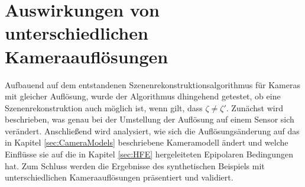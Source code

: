 \chapter{Auswirkungen von unterschiedlichen Kameraauflösungen}
\label{sec:minimalAuf} 


Aufbauend auf dem entstandenen Szenenrekonstruktionsalgorithmus für Kameras mit gleicher Auflösung, wurde der Algorithmus dhingehend getestet, ob eine Szenenrekonstruktion auch möglich ist, wenn gilt, dass $\zeta \neq \zeta'$. Zunächst wird beschrieben, was genau bei der Umstellung der Auflösung auf einem Sensor sich verändert. Anschließend wird analysiert, wie sich die Auflösungsänderung auf das in Kapitel \ref{sec:CameraModels} beschriebene Kameramodell ändert und welche Einflüsse sie auf die in Kapitel \ref{sec:HFE} hergeleiteten Epipolaren Bedingungen hat. Zum Schluss werden die Ergebnisse des synthetischen Beispiels mit unterschiedlichen Kameraauflösungen präsentiert und validiert.
 
%
%
%
%
%


